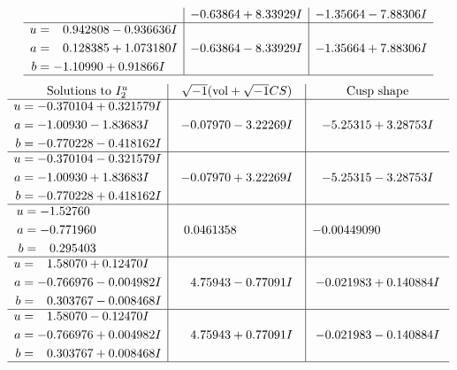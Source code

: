 \documentclass[1p]{elsarticle_modified}
\theoremstyle{definition}
\newcommand{\I}{\sqrt{-1}}
\begin{document}
$$\begin{array}{c|c|c}
 & -0.63864 + 8.33929 I & -1.35664 - 7.88306 I \\ \hline\begin{aligned}
u &= \phantom{-}0.942808 - 0.936636 I \\
a &= \phantom{-}0.128385 + 1.073180 I \\
b &= -1.10990 + 0.91866 I\end{aligned}
 & -0.63864 - 8.33929 I & -1.35664 + 7.88306 I\\
 \hline 
 \end{array}$$\newpage$$\begin{array}{c|c|c}  
\text{Solutions to }I^u_{2}& \I (\text{vol} + \sqrt{-1}CS) & \text{Cusp shape}\\
 \hline 
\begin{aligned}
u &= -0.370104 + 0.321579 I \\
a &= -1.00930 - 1.83683 I \\
b &= -0.770228 - 0.418162 I\end{aligned}
 & -0.07970 - 3.22269 I & -5.25315 + 3.28753 I \\ \hline\begin{aligned}
u &= -0.370104 - 0.321579 I \\
a &= -1.00930 + 1.83683 I \\
b &= -0.770228 + 0.418162 I\end{aligned}
 & -0.07970 + 3.22269 I & -5.25315 - 3.28753 I \\ \hline\begin{aligned}
u &= -1.52760\phantom{ +0.000000I} \\
a &= -0.771960\phantom{ +0.000000I} \\
b &= \phantom{-}0.295403\phantom{ +0.000000I}\end{aligned}
 & \phantom{-}0.0461358\phantom{ +0.000000I} & -0.00449090\phantom{ +0.000000I} \\ \hline\begin{aligned}
u &= \phantom{-}1.58070 + 0.12470 I \\
a &= -0.766976 - 0.004982 I \\
b &= \phantom{-}0.303767 - 0.008468 I\end{aligned}
 & \phantom{-}4.75943 - 0.77091 I & -0.021983 + 0.140884 I \\ \hline\begin{aligned}
u &= \phantom{-}1.58070 - 0.12470 I \\
a &= -0.766976 + 0.004982 I \\
b &= \phantom{-}0.303767 + 0.008468 I\end{aligned}
 & \phantom{-}4.75943 + 0.77091 I & -0.021983 - 0.140884 I\\
 \hline 
 \end{array}$$\newpage\newpage\renewcommand{\arraystretch}{1}
\end{document}
